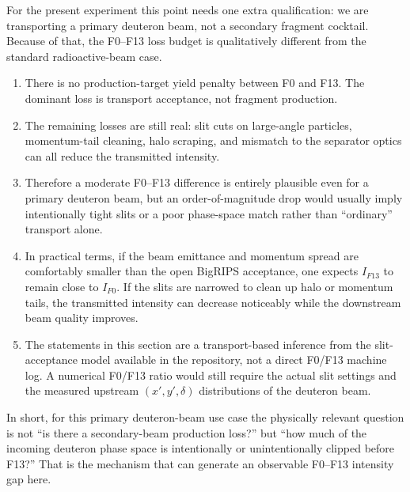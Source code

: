 \documentclass[11pt,a4paper]{article}
\begin{document}
For the present experiment this point needs one extra qualification: we are transporting a primary deuteron beam, not a secondary fragment cocktail. Because of that, the F0--F13 loss budget is qualitatively different from the standard radioactive-beam case.
\begin{enumerate}
    \item There is no production-target yield penalty between F0 and F13. The dominant loss is transport acceptance, not fragment production.
    \item The remaining losses are still real: slit cuts on large-angle particles, momentum-tail cleaning, halo scraping, and mismatch to the separator optics can all reduce the transmitted intensity.
    \item Therefore a moderate F0--F13 difference is entirely plausible even for a primary deuteron beam, but an order-of-magnitude drop would usually imply intentionally tight slits or a poor phase-space match rather than ``ordinary'' transport alone.
    \item In practical terms, if the beam emittance and momentum spread are comfortably smaller than the open BigRIPS acceptance, one expects $I_{F13}$ to remain close to $I_{F0}$. If the slits are narrowed to clean up halo or momentum tails, the transmitted intensity can decrease noticeably while the downstream beam quality improves.
    \item The statements in this section are a transport-based inference from the slit-acceptance model available in the repository, not a direct F0/F13 machine log. A numerical F0/F13 ratio would still require the actual slit settings and the measured upstream $(x',y',\delta)$ distributions of the deuteron beam.
    \end{enumerate}

In short, for this primary deuteron-beam use case the physically relevant question is not ``is there a secondary-beam production loss?'' but ``how much of the incoming deuteron phase space is intentionally or unintentionally clipped before F13?'' That is the mechanism that can generate an observable F0--F13 intensity gap here.



\end{document}
